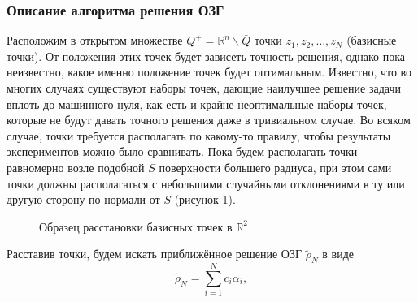 \documentclass[a4paper]{article}
\newcommand{\R}[1]{\mathbb{R}^#1}
\begin{document}
\subsubsection{Описание алгоритма решения ОЗГ}
Расположим в открытом множестве $Q^+= \R{n}\backslash \bar Q$ точки $z_1,z_2,\dots,z_N$ (базисные точки). От положения этих точек будет зависеть точность решения, однако пока неизвестно, какое именно положение точек будет оптимальным.
Известно, что во многих случаях существуют наборы точек, дающие наилучшее решение задачи вплоть до машинного нуля, как есть и крайне неоптимальные наборы точек, которые не будут давать точного решения даже в тривиальном случае.
Во всяком случае, точки требуется располагать по какому-то правилу, чтобы результаты экспериментов можно было сравнивать.
Пока будем располагать точки равномерно возле подобной $S$ поверхности большего радиуса, при этом сами точки должны располагаться с небольшими случайными отклонениями в ту или другую сторону по нормали от $S$ (рисунок \ref{sample}).

\begin{figure}[!h]
  \noindent{}
  \caption{Образец расстановки базисных точек в $\R{2}$}
  \label{sample}
\end{figure}


Расставив точки, будем искать приближённое решение ОЗГ $\tilde \rho_N$ в виде
\begin{equation}
  \tilde \rho_N=\sum_{i=1}^N c_i \alpha_i,
\end{equation}
\end{document}
